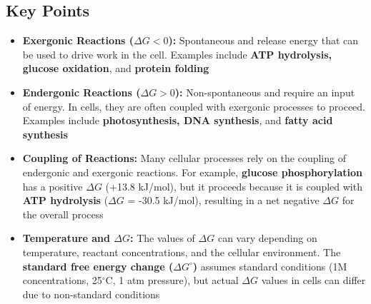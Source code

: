 \documentclass[10pt]{article}
\begin{document}
\subsection*{Key Points}
\begin{itemize}
    \item \textbf{Exergonic Reactions ($\Delta G < 0$):} Spontaneous and release energy that can be used to drive work in the cell. Examples include \textbf{ATP hydrolysis, glucose oxidation}, and \textbf{protein folding}
    \item \textbf{Endergonic Reactions ($\Delta G > 0$):} Non-spontaneous and require an input of energy. In cells, they are often coupled with exergonic processes to proceed. Examples include \textbf{photosynthesis, DNA synthesis}, and \textbf{fatty acid synthesis}
    \item \textbf{Coupling of Reactions:} Many cellular processes rely on the coupling of endergonic and exergonic reactions. For example, \textbf{glucose phosphorylation} has a positive $\Delta G$ (+13.8 kJ/mol), but it proceeds because it is coupled with \textbf{ATP hydrolysis} ($\Delta G$ = -30.5 kJ/mol), resulting in a net negative $\Delta G$ for the overall process
    \item \textbf{Temperature and $\Delta G$:} The values of $\Delta G$ can vary depending on temperature, reactant concentrations, and the cellular environment. The \textbf{standard free energy change ($\Delta G^\circ$)} assumes standard conditions (1M concentrations, 25$^\circ$C, 1 atm pressure), but actual $\Delta G$ values in cells can differ due to non-standard conditions
\end{itemize}
\end{document}
